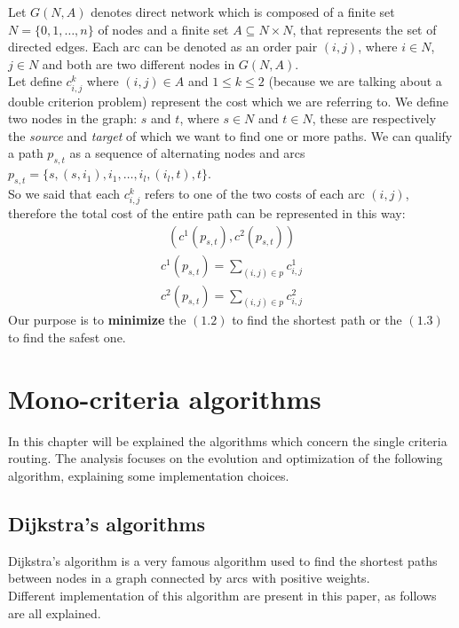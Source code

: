 \documentclass[a4paper,11pt]{report}
\begin{document}
Let $G(N,A)$ denotes direct network which is composed of a finite set $N=\{0,1, \dots, n\}$ of nodes and a finite set $A \subseteq N\times N $, that represents the set of directed edges. Each arc can be denoted as an order pair $(i,j)$, where $i\in N$, $j \in N$ and both are two different nodes in $G(N,A)$.\\
Let define $c^k_{i,j}$ where $(i,j)\in A$ and $1\leq k \leq 2$ (because we are talking about a double criterion problem) represent the cost which we are referring to. We define two nodes in the graph: $s$ and $t$, where $s \in N$ and $t \in N$, these are respectively the \textit{source} and \textit{target} of which we want to find one or more paths.
We can qualify a path $p_{s,t}$ as a sequence  of  alternating nodes and arcs $p_{s,t} = \{s, (s, i_1), i_1, \dots, i_{l}, (i_l,t), t\}$.\\
So we said that each $c^k_{i,j}$ refers to one of the two costs of each arc $(i,j)$, therefore the total cost of the entire path can be represented in this way:\\

\begin{gather}(c^1(p_{s,t}), c^2(p_{s,t}))\end{gather}
\begin{gather}c^1(p_{s,t})=\sum_{(i,j)\in p}c^1_{i,j}\end{gather}
\begin{gather}c^2(p_{s,t})=\sum_{(i,j)\in p}c^2_{i,j}\end{gather}
Our purpose is to \textbf{minimize} the $(1.2)$ to find the shortest path or the $(1.3)$ to find the safest one.

\chapter{Mono-criteria algorithms}

In this chapter will be explained the algorithms which concern the single criteria routing.
The analysis focuses on the evolution and optimization of the following algorithm, explaining some implementation choices.

\section{Dijkstra's algorithms}

Dijkstra's algorithm is a very famous algorithm used to find the shortest paths between nodes in a graph connected by arcs with positive weights.\\
Different implementation of this algorithm are present in this paper, as follows are all explained.
\end{document}
